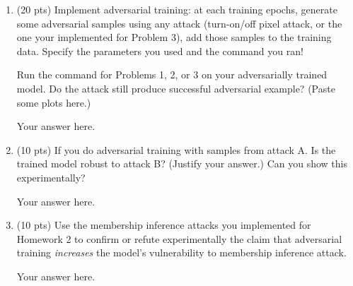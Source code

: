 %
\begin{enumerate}
%
	\item (20 pts) Implement adversarial training: at each training epochs, generate some adversarial samples using any attack (turn-on/off pixel attack, or the one your implemented for Problem 3), add those samples to the training data. Specify the parameters you used and the command you ran!
	
	Run the command for Problems 1, 2, or 3 on your adversarially trained model. Do the attack still produce successful adversarial example? (Paste some plots here.)
	
	\begin{answer}
	
		Your answer here.
		
	\end{answer}

	
	\item (10 pts) If you do adversarial training with samples from attack A. Is the trained model robust to attack B? (Justify your answer.) Can you show this experimentally?
	
	\begin{answer}
	
		Your answer here.
		
	\end{answer}
	
	\item (10 pts) Use the membership inference attacks you implemented for Homework 2 to confirm or refute experimentally the claim that adversarial training {\em increases} the model's vulnerability to membership inference attack.
	
	\begin{answer}
	
		Your answer here.
		
	\end{answer}
	
%
\end{enumerate}







